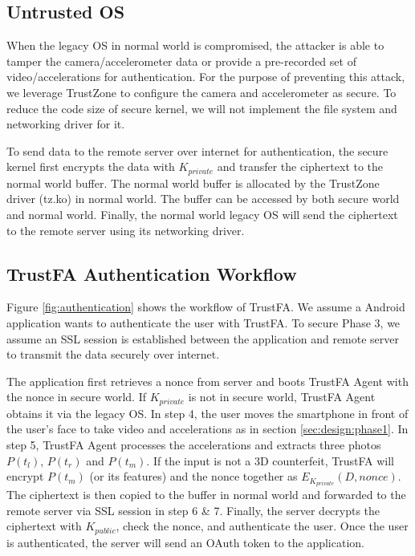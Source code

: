 \subsection{Untrusted OS}
\label{sec:design:phase2}

When the legacy OS in normal world is compromised, the attacker is able to
tamper the camera/accelerometer data or provide a pre-recorded set of video/accelerations 
for authentication.  For the purpose of preventing this
attack, we leverage TrustZone to configure the camera and accelerometer as secure.
To reduce the code size of secure kernel, we will not implement the file system
and networking driver for it. 

To send data to the remote server over internet for
authentication, the secure kernel first encrypts the data with $K_{private}$ and
transfer the ciphertext to the normal world buffer. The normal world buffer is
allocated by the TrustZone driver (tz.ko) in normal world. The buffer can be
accessed by both secure world and normal world. Finally, the normal world legacy
OS will send the ciphertext to the remote server using its networking driver.

\subsection{TrustFA Authentication Workflow}

Figure \ref{fig:authentication} shows the workflow of TrustFA. We assume a
Android application wants to authenticate the user with TrustFA. To secure Phase
3, we assume an SSL session is established between the application and remote
server to transmit the data securely over internet.

The application first retrieves a nonce from server and boots TrustFA Agent with
the nonce in secure world. If $K_{private}$ is not in secure world, TrustFA
Agent obtains it via the legacy OS. In step 4, the user moves the smartphone in
front of the user's face to take video and accelerations as in section
\ref{sec:design:phase1}. In step 5, TrustFA Agent processes the accelerations
and extracts three photos $P(t_l)$, $P(t_r)$ and $P(t_m)$. If the input is not a
3D counterfeit, TrustFA will encrypt $P(t_m)$ (or its features) and the nonce
together as
$E_{K_{private}}(D, nonce)$. The ciphertext is then copied to the buffer in
normal world and forwarded to the remote server via SSL session in step 6 \& 7.
Finally, the server decrypts the ciphertext with $K_{public}$, check the nonce, and
authenticate the user. Once the user is authenticated, the server will send an
OAuth token to the application.
